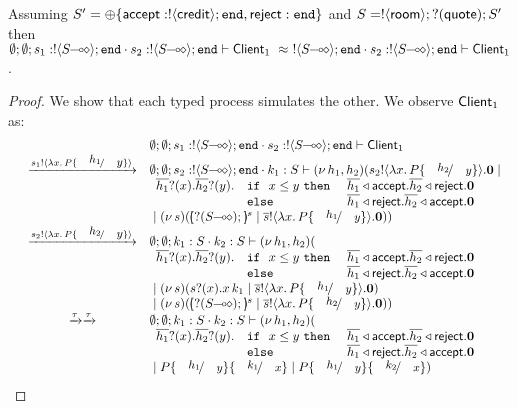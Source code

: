 \begin{proposition}
	Assuming $S' = \oplus \{\mathsf{accept}: ! \langle \mathsf{credit} \rangle ; \mathtt{end}, \mathsf{reject}: \mathtt{end}\}$ and
	$S = ! \langle \mathsf{room} \rangle ; ? (\mathsf{quote}) ; S'$
	then
	$\es; \es; s_1: \btout{\lhot{S}} \tinact \cat s_2: \btout{\lhot{S}} \tinact \proves \Client_1\ \wb\ \btout{\lhot{S}} \tinact \cat s_2: \btout{\lhot{S}} \tinact \proves \Client_1$.
\end{proposition}

\begin{proof}
	We show that each typed process simulates the other. We observe $\mathsf{Client}_1$ as:
\[
	\begin{array}{rcl}
		&& \es; \es; s_1: \btout{\lhot{S}} \tinact \cat s_2: \btout{\lhot{S}} \tinact \proves \Client_1
	\\

		&\by{\bactout{s_1}{\abs{x}{P \subst{h_1}{y}}}}&
		\es; \es; s_2: \btout{\lhot{S}} \tinact \cat k_1: S \proves \newsp{h_1, h_2}{\bout{s_2}{\abs{x}{P \subst{h_2}{y}}} \inact \Par\\
		&&
		\begin{array}{lll}
			\binp{\dual{h_1}}{x} \binp{\dual{h_2}}{y} & \If\ x \leq y\ \Then & \bsel{\dual{h_1}}{\accept} \bsel{\dual{h_2}}{\reject} \inact\\
			& \Else& \bsel{\dual{h_1}}{\reject} \bsel{\dual{h_2}}{\accept} \inact
		\end{array} \\
		&& \Par \newsp{s}{\mapchar{\btinp{\lhot{S}}}{s} \Par \bout{\dual{s}}{\abs{x}{P \subst{h_1}{y}}} \inact }}
	\\

		&\by{\bactout{s_2}{\abs{x}{P \subst{h_2}{y}}}}&
		\es; \es; k_1: S \cat k_2: S \proves \newsp{h_1, h_2}{\\
		&&
		\begin{array}{lll}
			\binp{\dual{h_1}}{x} \binp{\dual{h_2}}{y} & \If\ x \leq y\ \Then & \bsel{\dual{h_1}}{\accept} \bsel{\dual{h_2}}{\reject} \inact\\
			& \Else& \bsel{\dual{h_1}}{\reject} \bsel{\dual{h_2}}{\accept} \inact
		\end{array} \\
		&& \Par \newsp{s}{\binp{s}{x} \appl{x}{k_1} \Par \bout{\dual{s}}{\abs{x}{P \subst{h_1}{y}}} \inact }\\
		&& \Par \newsp{s}{\mapchar{\btinp{\lhot{S}}}{s} \Par \bout{\dual{s}}{\abs{x}{P \subst{h_2}{y}}} \inact }}
	\\

		&\by{\tau}\by{\tau}&
		\es; \es; k_1: S \cat k_2: S \proves \newsp{h_1, h_2}{\\
		&&
		\begin{array}{lll}
			\binp{\dual{h_1}}{x} \binp{\dual{h_2}}{y} & \If\ x \leq y\ \Then & \bsel{\dual{h_1}}{\accept} \bsel{\dual{h_2}}{\reject} \inact\\
			& \Else& \bsel{\dual{h_1}}{\reject} \bsel{\dual{h_2}}{\accept} \inact
		\end{array} \\
		&& \Par P\subst{h_1}{y} \subst{k_1}{x} \Par P\subst{h_1}{y} \subst{k_2}{x}}
	\\


\end{array}\]
\end{proof}
